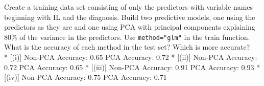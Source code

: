 Create a training data set consisting of only the predictors with variable names beginning with IL and the diagnosis. 
Build two predictive models, one using the predictors as they are and one using PCA with principal components explaining 80\% of the variance in the predictors. 
Use \texttt{method="glm"} in the train function. 
\\
What is the accuracy of each method in the test set? Which is more accurate?\\

* [(i)] Non-PCA Accuracy: 0.65 
PCA Accuracy: 0.72
* [(ii)]  Non-PCA Accuracy: 0.72 
PCA Accuracy: 0.65
* [(iii)]  Non-PCA Accuracy: 0.91 
PCA Accuracy: 0.93
* [(iv)]  Non-PCA Accuracy: 0.75 
PCA Accuracy: 0.71


